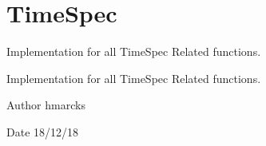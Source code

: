 \hypertarget{group__timeSpec}{}\section{Time\+Spec}
\label{group__timeSpec}


Implementation for all Time\+Spec Related functions.  


Implementation for all Time\+Spec Related functions. 

\begin{DoxyAuthor}{Author}
hmarcks
\end{DoxyAuthor}
\begin{DoxyDate}{Date}
18/12/18 
\end{DoxyDate}
